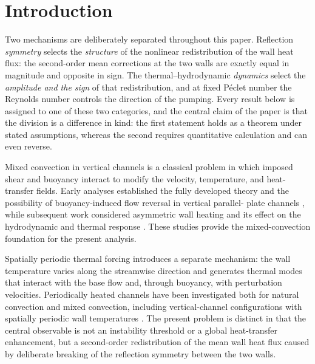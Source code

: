 \documentclass[12pt,a4paper]{article}
\begin{document}
\section{Introduction}

Two mechanisms are deliberately separated throughout this paper. Reflection
\emph{symmetry} selects the \emph{structure} of the nonlinear redistribution of the
wall heat flux: the second-order mean corrections at the two walls are exactly equal
in magnitude and opposite in sign. The thermal--hydrodynamic \emph{dynamics} select
the \emph{amplitude and the sign} of that redistribution, and at fixed P\'eclet
number the Reynolds number controls the direction of the pumping. Every result below
is assigned to one of these two categories, and the central claim of the paper is
that the division is a difference in kind: the first statement holds as a
theorem under stated assumptions, whereas the second requires quantitative
calculation and can even reverse.

Mixed convection in vertical channels is a classical problem in which imposed shear and buoyancy
interact to modify the velocity, temperature, and heat-transfer fields. Early analyses established
the fully developed theory and the possibility of buoyancy-induced flow reversal in vertical parallel-
plate channels \cite{AungWorku1986Theory,AungWorku1986Developing,HamadahWirtz1991}, while subsequent
work considered asymmetric wall heating and its effect on the hydrodynamic and thermal response
\cite{AungWorku1987,Barletta1998,Barletta1999}. These studies provide the mixed-convection foundation
for the present analysis.

Spatially periodic thermal forcing introduces a separate mechanism: the wall temperature varies along
the streamwise direction and generates thermal modes that interact with the base flow and, through
buoyancy, with perturbation velocities. Periodically heated channels have been investigated both for
natural convection and mixed convection, including vertical-channel configurations with spatially
periodic wall temperatures \cite{Dritselis2013,HossainFloryan2015}. The present problem is distinct in
that the central observable is not an instability threshold or a global heat-transfer enhancement,
but a second-order redistribution of the mean wall heat flux caused by deliberate breaking of the
reflection symmetry between the two walls.
\end{document}
